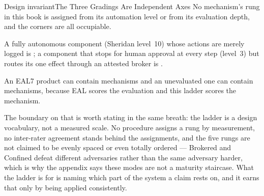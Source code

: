 \documentclass[11pt,a4paper]{article}
\theoremstyle{definition}
\theoremstyle{remark}
\begin{document}
\begin{pdclaim}{Design invariant}{The Three Gradings Are Independent Axes}
\setlength{\parskip}{4pt plus 1pt}
No mechanism's rung in this book is assigned from its automation level or from
its evaluation depth, and the corners are all occupiable.

A fully autonomous
component (Sheridan level~10) whose actions are merely logged is
; a component that stops for human approval at every step
(level~3) but routes its one effect through an attested broker is
.

An EAL7 product can contain 
mechanisms and an unevaluated one can contain  mechanisms,
because EAL scores the evaluation and this ladder scores the mechanism.
\end{pdclaim}

The boundary on that is worth stating in the same breath: the ladder is a design
vocabulary, not a measured scale. No procedure assigns a rung by measurement, no
inter-rater agreement stands behind the assignments, and the five rungs are not
claimed to be evenly spaced or even totally ordered --- Brokered and Confined
defeat different adversaries rather than the same adversary harder, which is why
the appendix says these modes are not a maturity staircase. What the ladder is
for is naming which part of the system a claim rests on, and it earns that only
by being applied consistently.
\end{document}
